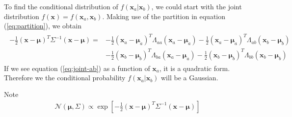 {To find the conditional distribution of $f(\mathbf{x}_a|\mathbf{x}_b)$, we could start with the joint distribution $f(\mathbf{x}) = f(\mathbf{x}_a, \mathbf{x}_b)$. Making use of the partition in equation (\ref{eq:partition}), we obtain
\begin{align}
\begin{split}
-\frac{1}{2}(\mathbf{x}-\mathbf{\mu})^T\Sigma^{-1}(\mathbf{x}-\mathbf{\mu}) =  & -\frac{1}{2}(\mathbf{x}_a-\mathbf{\mu}_{a})^{T}\Lambda_{aa}(\mathbf{x}_a-\mathbf{\mu}_{a})-\frac{1}{2}(\mathbf{x}_a-\mathbf{\mu}_{a})^{T}\Lambda_{ab}(\mathbf{x}_b-\mathbf{\mu}_{b}) \\
                                                & -\frac{1}{2}(\mathbf{x}_b-\mathbf{\mu}_{b})^{T}\Lambda_{ba}(\mathbf{x}_a-\mathbf{\mu}_{a})
-\frac{1}{2}(\mathbf{x}_b-\mathbf{\mu}_{b})^{T}\Lambda_{bb}(\mathbf{x}_b-\mathbf{\mu}_{b})
\end{split}
\label{eq:joint-ab}
\end{align}
If we see equation (\ref{eq:joint-ab}) as a function of $\mathbf{x}_a$, it is a quadratic form. Therefore we the conditional probability $f(\mathbf{x}_a|\mathbf{x}_b)$ will be a Gaussian.

Note
\begin{align}
\mathcal{N}(\mathbf{\mu},\Sigma) \propto \exp \left[-\frac{1}{2}(\mathbf{x}-\mathbf{\mu})^T\Sigma^{-1}(\mathbf{x}-\mathbf{\mu})\right]
\end{align}

}
